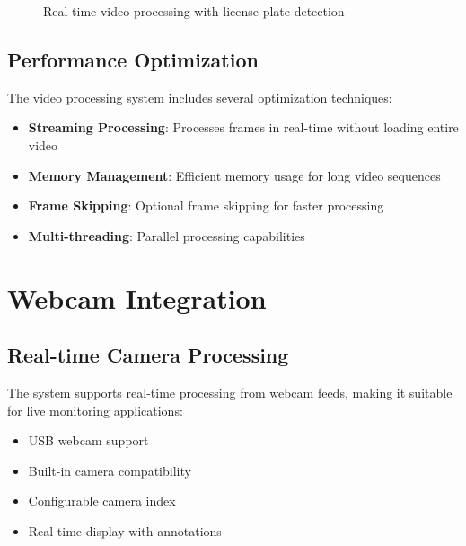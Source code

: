 \documentclass[12pt,a4paper]{article}
\begin{document}
\begin{figure}[H]
\centering
\caption{Real-time video processing with license plate detection}
\end{figure}

\subsection{Performance Optimization}

The video processing system includes several optimization techniques:

\begin{itemize}
    \item \textbf{Streaming Processing}: Processes frames in real-time without loading entire video
    \item \textbf{Memory Management}: Efficient memory usage for long video sequences
    \item \textbf{Frame Skipping}: Optional frame skipping for faster processing
    \item \textbf{Multi-threading}: Parallel processing capabilities
\end{itemize}

\section{Webcam Integration}

\subsection{Real-time Camera Processing}

The system supports real-time processing from webcam feeds, making it suitable for live monitoring applications:

\begin{itemize}
    \item USB webcam support
    \item Built-in camera compatibility
    \item Configurable camera index
    \item Real-time display with annotations
\end{itemize}
\end{document}
